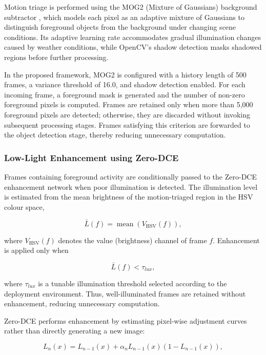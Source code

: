 \documentclass[runningheads]{llncs}
\begin{document}
Motion triage is performed using the MOG2 (Mixture of Gaussians) background subtractor \cite{zivkovic2004mog2}, which models each pixel as an adaptive mixture of Gaussians to distinguish foreground objects from the background under changing scene conditions. Its adaptive learning rate accommodates gradual illumination changes caused by weather conditions, while OpenCV's shadow detection masks shadowed regions before further processing.

In the proposed framework, MOG2 is configured with a history length of 500 frames, a variance threshold of 16.0, and shadow detection enabled. For each incoming frame, a foreground mask is generated and the number of non-zero foreground pixels is computed. Frames are retained only when more than 5,000 foreground pixels are detected; otherwise, they are discarded without invoking subsequent processing stages. Frames satisfying this criterion are forwarded to the object detection stage, thereby reducing unnecessary computation.

\subsubsection{Low-Light Enhancement using Zero-DCE}

Frames containing foreground activity are conditionally passed to the
Zero-DCE enhancement network \cite{zerodce} when poor illumination is
detected. The illumination level is estimated from the mean brightness of
the motion-triaged region in the HSV colour space,

\begin{equation}
\bar{L}(f)=\operatorname{mean}\left(V_{\mathrm{HSV}}(f)\right),
\end{equation}

where $V_{\mathrm{HSV}}(f)$ denotes the value (brightness) channel of frame
$f$. Enhancement is applied only when

\begin{equation}
\bar{L}(f)<\tau_{lux},
\end{equation}

where $\tau_{lux}$ is a tunable illumination threshold selected according
to the deployment environment. Thus, well-illuminated frames are retained
without enhancement, reducing unnecessary computation.

Zero-DCE performs enhancement by estimating pixel-wise adjustment curves
rather than directly generating a new image:

\begin{equation}
L_n(x)=L_{n-1}(x)+\alpha_nL_{n-1}(x)
\left(1-L_{n-1}(x)\right),
\end{equation}
\end{document}
